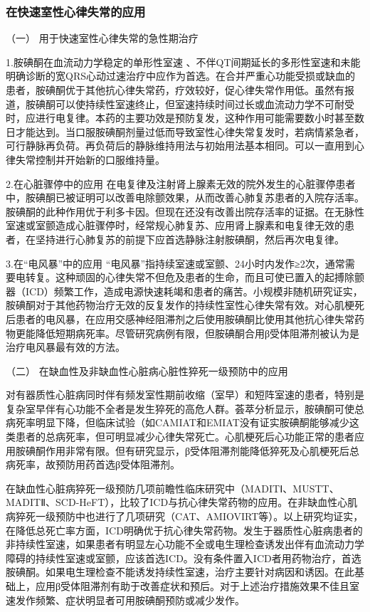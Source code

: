 \subsubsection{在快速室性心律失常的应用}

\hypertarget{text00425.htmlux5cux23CHP17-4-7-2-3-1}{}
（一） 用于快速室性心律失常的急性期治疗

1.胺碘酮在血流动力学稳定的单形性室速
、不伴QT间期延长的多形性室速和未能明确诊断的宽QRS心动过速治疗中应作为首选。在合并严重心功能受损或缺血的患者，胺碘酮优于其他抗心律失常药，疗效较好，促心律失常作用低。虽然有报道，胺碘酮可以使持续性室速终止，但室速持续时间过长或血流动力学不可耐受时，应进行电复律。本药的主要功效是预防复发，这种作用可能需要数小时甚至数日才能达到。当口服胺碘酮剂量过低而导致室性心律失常复发时，若病情紧急者，可行静脉再负荷。再负荷后的静脉维持用法与初始用法基本相同。可以一直用到心律失常控制并开始新的口服维持量。

2.在心脏骤停中的应用
在电复律及注射肾上腺素无效的院外发生的心脏骤停患者中，胺碘酮已被证明可以改善电除颤效果，从而改善心肺复苏患者的入院存活率。胺碘酮的此种作用优于利多卡因。但现在还没有改善出院存活率的证据。在无脉性室速或室颤造成心脏骤停时，经常规心肺复苏、应用肾上腺素和电复律无效的患者，在坚持进行心肺复苏的前提下应首选静脉注射胺碘酮，然后再次电复律。

3.在“电风暴”中的应用
“电风暴”指持续室速或室颤、24小时内发作≥2次，通常需要电转复。这种顽固的心律失常不但危及患者的生命，而且可使已置入的起搏除颤器（ICD）频繁工作，造成电源快速耗竭和患者的痛苦。小规模非随机研究证实，胺碘酮对于其他药物治疗无效的反复发作的持续性室性心律失常有效。对心肌梗死后患者的电风暴，在应用交感神经阻滞剂之后使用胺碘酮比使用其他抗心律失常药物更能降低短期病死率。尽管研究病例有限，但胺碘酮合用β受体阻滞剂被认为是治疗电风暴最有效的方法。

\hypertarget{text00425.htmlux5cux23CHP17-4-7-2-3-2}{}
（二） 在缺血性及非缺血性心脏病心脏性猝死一级预防中的应用

对有器质性心脏病同时伴有频发室性期前收缩（室早）和短阵室速的患者，特别是复杂室早伴有心功能不全者是发生猝死的高危人群。荟萃分析显示，胺碘酮可使总病死率明显下降，但临床试验（如CAMIAT和EMIAT没有证实胺碘酮能够减少这类患者的总病死率，但可明显减少心律失常死亡。心肌梗死后心功能正常的患者应用胺碘酮作用非常有限。但有研究显示，β受体阻滞剂能降低猝死及心肌梗死后总病死率，故预防用药首选β受体阻滞剂。

在缺血性心脏病猝死一级预防几项前瞻性临床研究中（MADITⅠ、MUSTT、MADITⅡ、SCD-HeFT），比较了ICD与抗心律失常药物的应用。在非缺血性心肌病猝死一级预防中也进行了几项研究（CAT、AMIOVIRT等）。以上研究均证实，在降低总死亡率方面，ICD明确优于抗心律失常药物。发生于器质性心脏病患者的非持续性室速，如果患者有明显左心功能不全或电生理检查诱发出伴有血流动力学障碍的持续性室速或室颤，应该首选ICD。没有条件置入ICD者用药物治疗，首选胺碘酮。如果电生理检查不能诱发持续性室速，治疗主要针对病因和诱因。在此基础上，应用β受体阻滞剂有助于改善症状和预后。对于上述治疗措施效果不佳且室速发作频繁、症状明显者可用胺碘酮预防或减少发作。

